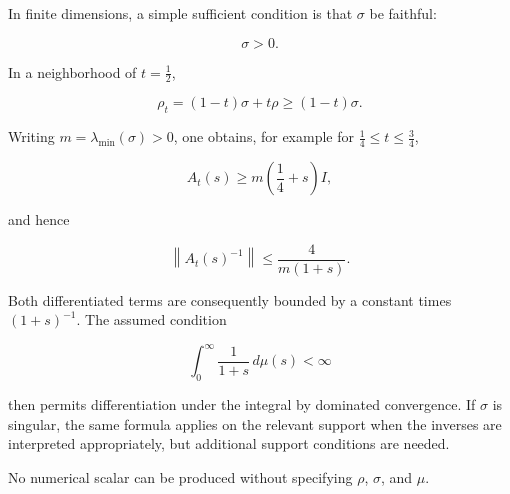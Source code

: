 In finite dimensions, a simple sufficient condition is that $\sigma$ be faithful:

\[
\sigma>0.
\]

In a neighborhood of $t=\frac12$,

\[
\rho_t=(1-t)\sigma+t\rho\geq(1-t)\sigma.
\]

Writing $m=\lambda_{\min}(\sigma)>0$, one obtains, for example for $\frac14\leq t\leq\frac34$,

\[
A_t(s)\geq m\left(\frac14+s\right)I,
\]

and hence

\[
\left\|A_t(s)^{-1}\right\| \leq \frac{4}{m(1+s)}.
\]

Both differentiated terms are consequently bounded by a constant times $(1+s)^{-1}$. The assumed condition

\[
\int_0^\infty\frac{1}{1+s}\,d\mu(s)<\infty
\]

then permits differentiation under the integral by dominated convergence. If $\sigma$ is singular, the same formula applies on the relevant support when the inverses are interpreted appropriately, but additional support conditions are needed.

No numerical scalar can be produced without specifying $\rho$, $\sigma$, and $\mu$.
